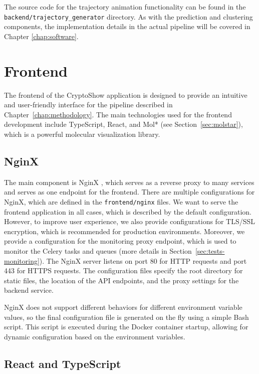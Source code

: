 The source code for the trajectory animation functionality can be found in the \lstinline!backend/trajectory_generator! directory. As with the prediction and clustering components, the implementation details in the actual pipeline will be covered in Chapter \ref{chap:software}.


\section{Frontend}
\label{sec:frontend}

The frontend of the CryptoShow application is designed to provide an intuitive and user-friendly interface for the pipeline described in Chapter~\ref{chap:methodology}. The main technologies used for the frontend development include TypeScript, React, and Mol* (see Section~\ref{sec:molstar}), which is a powerful molecular visualization library. 

\subsection{NginX}
\label{sec:nginx}

The main component is NginX \cite{reese2008nginx}, which serves as a reverse proxy to many services and serves as one endpoint for the frontend. There are multiple configurations for NginX, which are defined in the \lstinline!frontend/nginx! files. We want to serve the frontend application in all cases, which is described by the default configuration. However, to improve user experience, we also provide configurations for TLS/SSL encryption, which is recommended for production environments. Moreover, we provide a configuration for the monitoring proxy endpoint, which is used to monitor the Celery tasks and queues (more details in Section~\ref{sec:tests-monitoring}). The NginX server listens on port 80 for HTTP requests and port 443 for HTTPS requests. The configuration files specify the root directory for static files, the location of the API endpoints, and the proxy settings for the backend service.

NginX does not support different behaviors for different environment variable values, so the final configuration file is generated on the fly using a simple Bash script. This script is executed during the Docker container startup, allowing for dynamic configuration based on the environment variables.

\subsection{React and TypeScript}
\label{sec:react-typescript}

